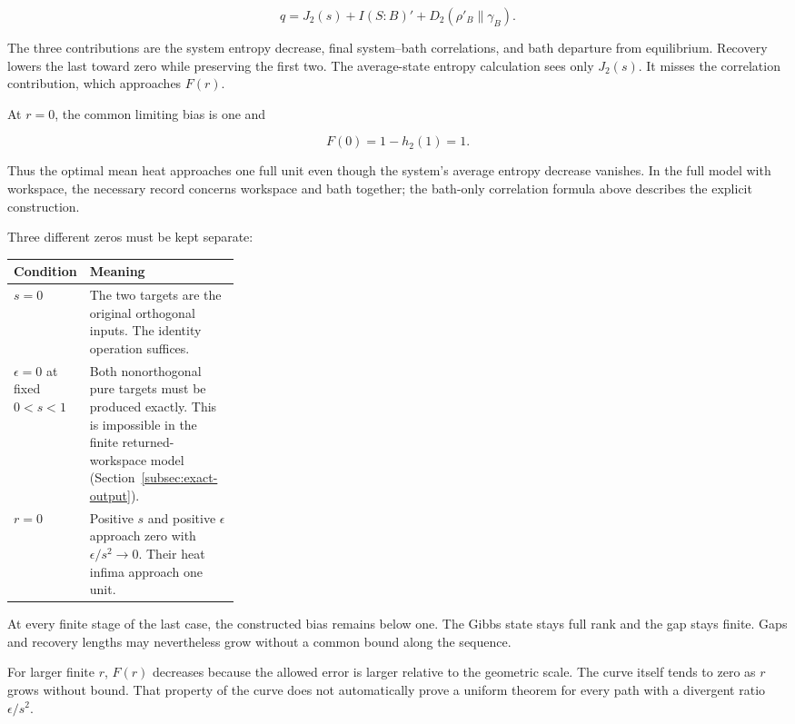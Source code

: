 \documentclass[11pt,letterpaper]{article}
\begin{document}
\[q = J_{2}(s) + I(S{:}B)' + D_{2}\left( \rho\prime_{B}\|\gamma_{B} \right).\]

The three contributions are the system entropy decrease, final system--bath correlations, and bath departure from equilibrium. Recovery lowers the last toward zero while preserving the first two. The average-state entropy calculation sees only \(J_{2}(s)\). It misses the correlation contribution, which approaches \(F(r)\).

At \(r = 0\), the common limiting bias is one and

\[F(0) = 1 - h_{2}(1) = 1.\]

Thus the optimal mean heat approaches one full unit even though the system's average entropy decrease vanishes. In the full model with workspace, the necessary record concerns workspace and bath together; the bath-only correlation formula above describes the explicit construction.

Three different zeros must be kept separate:

\begin{center}
\begin{tabularx}{\linewidth}{@{}p{0.29\linewidth}X@{}}
\toprule
\textbf{Condition} & \textbf{Meaning}\\
\midrule
$s=0$ & The two targets are the original orthogonal inputs. The identity operation suffices.\\[3pt]
$\epsilon=0$ at fixed $0<s<1$ & Both nonorthogonal pure targets must be produced exactly. This is impossible in the finite returned-workspace model (Section~\ref{subsec:exact-output}).\\[3pt]
$r=0$ & Positive $s$ and positive $\epsilon$ approach zero with $\epsilon/s^2\to0$. Their heat infima approach one unit.\\
\bottomrule
\end{tabularx}
\end{center}

At every finite stage of the last case, the constructed bias remains below one. The Gibbs state stays full rank and the gap stays finite. Gaps and recovery lengths may nevertheless grow without a common bound along the sequence.

For larger finite \(r\), \(F(r)\) decreases because the allowed error is larger relative to the geometric scale. The curve itself tends to zero as \(r\) grows without bound. That property of the curve does not automatically prove a uniform theorem for every path with a divergent ratio \(\epsilon/s^{2}\).
\end{document}
